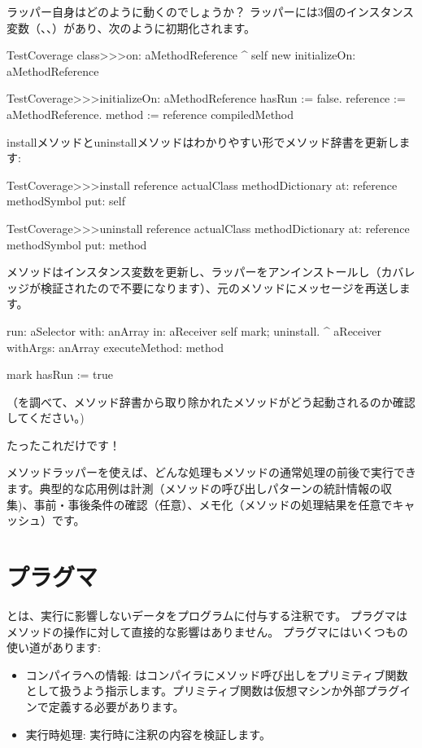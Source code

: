 \documentclass[a4paper,10pt,twoside]{book}
\begin{document}
ラッパー自身はどのように動くのでしょうか？
ラッパーには3個のインスタンス変数（、、）があり、次のように初期化されます。

\begin{code}{}
TestCoverage class>>>on: aMethodReference
	^ self new initializeOn: aMethodReference

TestCoverage>>>initializeOn: aMethodReference
	hasRun := false.
	reference := aMethodReference.
	method := reference compiledMethod
\end{code}

installメソッドとuninstallメソッドはわかりやすい形でメソッド辞書を更新します:
\begin{code}{}
TestCoverage>>>install
	reference actualClass methodDictionary
		at: reference methodSymbol
		put: self

TestCoverage>>>uninstall
	reference actualClass methodDictionary
		at: reference methodSymbol
		put: method
\end{code}
\noindent
{}メソッドはインスタンス変数を更新し、ラッパーをアンインストールし（カバレッジが検証されたので不要になります）、元のメソッドにメッセージを再送します。
\begin{code}{}
run: aSelector with: anArray in: aReceiver
	self mark; uninstall.
	^ aReceiver withArgs: anArray executeMethod: method

mark
	hasRun := true
\end{code}
（を調べて、メソッド辞書から取り除かれたメソッドがどう起動されるのか確認してください。)

たったこれだけです！

メソッドラッパーを使えば、どんな処理もメソッドの通常処理の前後で実行できます。典型的な応用例は計測（メソッドの呼び出しパターンの統計情報の収集)、事前・事後条件の確認（任意）、メモ化（メソッドの処理結果を任意でキャッシュ）です。

\section{プラグマ}

とは、実行に影響しないデータをプログラムに付与する注釈です。
プラグマはメソッドの操作に対して直接的な影響はありません。
プラグマにはいくつもの使い道があります:
\begin{itemize}
\item コンパイラへの情報: はコンパイラにメソッド呼び出しをプリミティブ関数として扱うよう指示します。プリミティブ関数は仮想マシンか外部プラグインで定義する必要があります。
\item 実行時処理: 実行時に注釈の内容を検証します。
\end{itemize}
\end{document}

